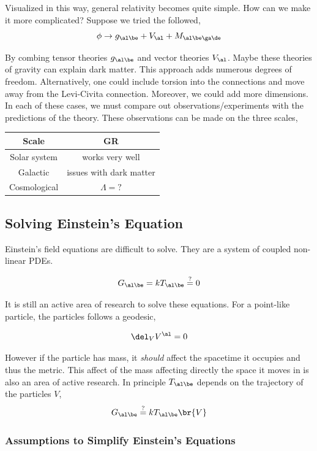 \documentclass{article}
\begin{document}
Visualized in this way, general relativity becomes quite simple. How can we make it more complicated? Suppose we tried the followed,
\[ \phi \to g_{\al\be} + V_{\al} + M_{\al\be\ga\de} \]

By combing tensor theories $g_{\al\be}$ and vector theories $V_{\al}$. Maybe these theories of gravity can explain dark matter. This approach adds numerous degrees of freedom. Alternatively, one could include torsion into the connections and move away from the Levi-Civita connection. Moreover, we could add more dimensions. \\

In each of these cases, we must compare out observations/experiments with the predictions of the theory. These observations can be made on the three scales,

\begin{center}
\begin{tabular}{|c|c|}
    \hline
    \textbf{Scale} & \textbf{GR} \\
    \hline
    Solar system & works very well \\
    Galactic & issues with dark matter \\
    Cosmological & $\Lambda = ?$ \\
    \hline
\end{tabular}
\end{center}

\subsection{Solving Einstein's Equation}
Einstein's field equations are difficult to solve. They are a system of coupled non-linear PDEs.

\[ G_{\al\be} = k T_{\al\be} \stackrel{?}{=} 0 \]

It is still an active area of research to solve these equations. For a point-like particle, the particles follows a geodesic,

\[ \del_V V^\al = 0 \]

However if the particle has mass, it \textit{should} affect the spacetime it occupies and thus the metric. This affect of the mass affecting directly the space it moves in is also an area of active research. In principle $T_{\al\be}$ depends on the trajectory of the particles $V$,
\[ G_{\al\be} \stackrel{?}{=} k T_{\al\be} \br{V} \]

\subsubsection{Assumptions to Simplify Einstein's Equations}
\end{document}
